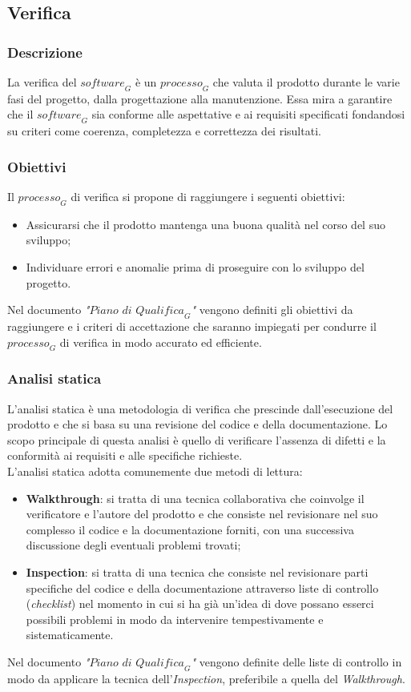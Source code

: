 \subsection{Verifica}
\subsubsection{Descrizione}
La verifica del $\textit{software}_G$ è un $\textit{processo}_G$ che valuta il prodotto durante le varie fasi del progetto, dalla progettazione alla manutenzione. Essa mira a garantire che il $\textit{software}_G$ sia conforme alle aspettative e ai requisiti specificati fondandosi su criteri come coerenza, completezza e correttezza dei risultati.
\subsubsection{Obiettivi}
Il $\textit{processo}_G$ di verifica si propone di raggiungere i seguenti obiettivi:
\begin{itemize}
    \item Assicurarsi che il prodotto mantenga una buona qualità nel corso del suo sviluppo;
    \item Individuare errori e anomalie prima di proseguire con lo sviluppo del progetto.
\end{itemize}
Nel documento \emph{"$\textit{Piano di Qualifica}_G$"} vengono definiti gli obiettivi da raggiungere e i criteri di accettazione  che saranno impiegati per condurre il $\textit{processo}_G$ di verifica in modo accurato ed efficiente. 
\subsubsection{Analisi statica}
L'analisi statica è una metodologia di verifica che prescinde dall'esecuzione del prodotto e che si basa su una revisione del codice e della documentazione. Lo scopo principale di questa analisi è quello di verificare l'assenza di difetti e la conformità ai requisiti e alle specifiche richieste. \\
L'analisi statica adotta comunemente due metodi di lettura:
\begin{itemize}
    \item \textbf{Walkthrough}: si tratta di una tecnica collaborativa che coinvolge il verificatore e l'autore del prodotto e che consiste nel revisionare nel suo complesso il codice e la documentazione forniti, con una successiva discussione degli eventuali problemi trovati;
    \item \textbf{Inspection}: si tratta di una tecnica che consiste nel revisionare parti specifiche del codice e della documentazione attraverso liste di controllo (\emph{checklist}) nel momento in cui si ha già un'idea di dove possano esserci possibili problemi in modo da intervenire tempestivamente e sistematicamente.
\end{itemize}
Nel documento \emph{"$\textit{Piano di Qualifica}_G$"} vengono definite delle liste di controllo in modo da applicare la tecnica dell'\textit{Inspection}, preferibile a quella del \textit{Walkthrough}.
